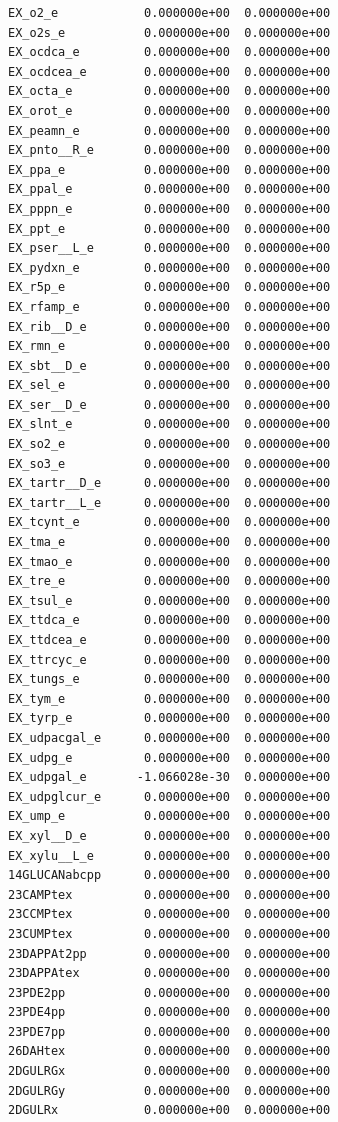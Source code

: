 \documentclass{scrartcl}
\begin{document}
\begin{enumerate}
\begin{lstlisting}
EX_o2_e            0.000000e+00  0.000000e+00
EX_o2s_e           0.000000e+00  0.000000e+00
EX_ocdca_e         0.000000e+00  0.000000e+00
EX_ocdcea_e        0.000000e+00  0.000000e+00
EX_octa_e          0.000000e+00  0.000000e+00
EX_orot_e          0.000000e+00  0.000000e+00
EX_peamn_e         0.000000e+00  0.000000e+00
EX_pnto__R_e       0.000000e+00  0.000000e+00
EX_ppa_e           0.000000e+00  0.000000e+00
EX_ppal_e          0.000000e+00  0.000000e+00
EX_pppn_e          0.000000e+00  0.000000e+00
EX_ppt_e           0.000000e+00  0.000000e+00
EX_pser__L_e       0.000000e+00  0.000000e+00
EX_pydxn_e         0.000000e+00  0.000000e+00
EX_r5p_e           0.000000e+00  0.000000e+00
EX_rfamp_e         0.000000e+00  0.000000e+00
EX_rib__D_e        0.000000e+00  0.000000e+00
EX_rmn_e           0.000000e+00  0.000000e+00
EX_sbt__D_e        0.000000e+00  0.000000e+00
EX_sel_e           0.000000e+00  0.000000e+00
EX_ser__D_e        0.000000e+00  0.000000e+00
EX_slnt_e          0.000000e+00  0.000000e+00
EX_so2_e           0.000000e+00  0.000000e+00
EX_so3_e           0.000000e+00  0.000000e+00
EX_tartr__D_e      0.000000e+00  0.000000e+00
EX_tartr__L_e      0.000000e+00  0.000000e+00
EX_tcynt_e         0.000000e+00  0.000000e+00
EX_tma_e           0.000000e+00  0.000000e+00
EX_tmao_e          0.000000e+00  0.000000e+00
EX_tre_e           0.000000e+00  0.000000e+00
EX_tsul_e          0.000000e+00  0.000000e+00
EX_ttdca_e         0.000000e+00  0.000000e+00
EX_ttdcea_e        0.000000e+00  0.000000e+00
EX_ttrcyc_e        0.000000e+00  0.000000e+00
EX_tungs_e         0.000000e+00  0.000000e+00
EX_tym_e           0.000000e+00  0.000000e+00
EX_tyrp_e          0.000000e+00  0.000000e+00
EX_udpacgal_e      0.000000e+00  0.000000e+00
EX_udpg_e          0.000000e+00  0.000000e+00
EX_udpgal_e       -1.066028e-30  0.000000e+00
EX_udpglcur_e      0.000000e+00  0.000000e+00
EX_ump_e           0.000000e+00  0.000000e+00
EX_xyl__D_e        0.000000e+00  0.000000e+00
EX_xylu__L_e       0.000000e+00  0.000000e+00
14GLUCANabcpp      0.000000e+00  0.000000e+00
23CAMPtex          0.000000e+00  0.000000e+00
23CCMPtex          0.000000e+00  0.000000e+00
23CUMPtex          0.000000e+00  0.000000e+00
23DAPPAt2pp        0.000000e+00  0.000000e+00
23DAPPAtex         0.000000e+00  0.000000e+00
23PDE2pp           0.000000e+00  0.000000e+00
23PDE4pp           0.000000e+00  0.000000e+00
23PDE7pp           0.000000e+00  0.000000e+00
26DAHtex           0.000000e+00  0.000000e+00
2DGULRGx           0.000000e+00  0.000000e+00
2DGULRGy           0.000000e+00  0.000000e+00
2DGULRx            0.000000e+00  0.000000e+00

\end{lstlisting}
\end{enumerate}
\end{document}
